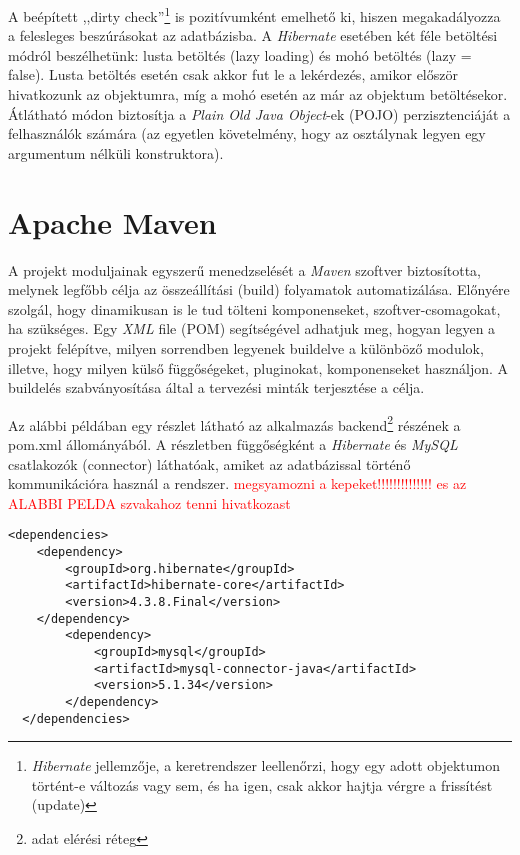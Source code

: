\par A beépített ,,dirty check”\footnote{\textit{Hibernate} jellemzője, a keretrendszer leellenőrzi, hogy egy adott objektumon történt-e változás vagy sem, és ha igen, csak akkor hajtja vérgre a frissítést (update)} is pozitívumként emelhető ki, hiszen megakadályozza a felesleges beszúrásokat az adatbázisba. A \textit{Hibernate} esetében két féle betöltési módról beszélhetünk: lusta betöltés (lazy loading) és mohó betöltés (lazy = false). Lusta betöltés esetén csak akkor fut le a  lekérdezés, amikor először hivatkozunk az objektumra, míg a mohó esetén az már az objektum betöltésekor. Átlátható módon biztosítja a \textit{Plain Old Java Object}-ek (POJO) perzisztenciáját a felhasználók számára (az egyetlen követelmény, hogy az osztálynak legyen egy argumentum nélküli konstruktora).
%
\section{Apache Maven}\label{sec:FELH:am}

A projekt moduljainak egyszerű menedzselését a \textit{Maven} szoftver biztosította, melynek legfőbb célja az összeállítási (build)  folyamatok automatizálása. Előnyére szolgál, hogy dinamikusan is le tud tölteni komponenseket, szoftver-csomagokat, ha szükséges. Egy \textit{XML} file (POM) segítségével adhatjuk meg, hogyan legyen a projekt felépítve, milyen sorrendben legyenek buildelve a különböző modulok, illetve, hogy milyen külső függőségeket, pluginokat, komponenseket használjon. A buildelés szabványosítása által a tervezési minták terjesztése a célja.
\par Az alábbi példában egy részlet látható az alkalmazás backend\footnote{adat elérési réteg} részének a  pom.xml állományából. A részletben függőségként a \textit{Hibernate} és \textit{MySQL} csatlakozók (connector) láthatóak, amiket az adatbázissal történő kommunikációra használ a rendszer.
\textcolor{red}{ megsyamozni a kepeket!!!!!!!!!!!!!! es az ALABBI PELDA szvakahoz tenni hivatkozast}

\lstset{language=XML}
\begin{lstlisting}
<dependencies>
  	<dependency>
		<groupId>org.hibernate</groupId>
		<artifactId>hibernate-core</artifactId>
		<version>4.3.8.Final</version>
	</dependency>
		<dependency>
			<groupId>mysql</groupId>
			<artifactId>mysql-connector-java</artifactId>
			<version>5.1.34</version>
		</dependency>
  </dependencies>
\end{lstlisting}

